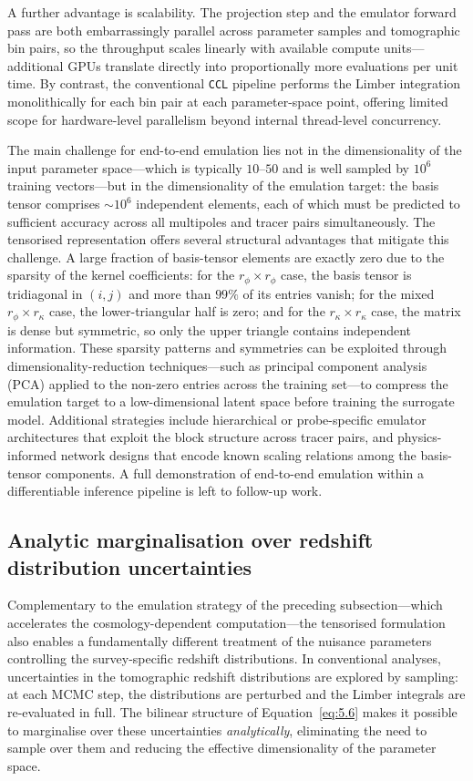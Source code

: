 A further advantage is scalability. The projection step and the emulator forward pass are both embarrassingly parallel across parameter samples and tomographic bin pairs, so the throughput scales linearly with available compute units---additional GPUs translate directly into proportionally more evaluations per unit time. By contrast, the conventional \texttt{CCL} pipeline performs the Limber integration monolithically for each bin pair at each parameter-space point, offering limited scope for hardware-level parallelism beyond internal thread-level concurrency.

The main challenge for end-to-end emulation lies not in the dimensionality of the input parameter space---which is typically \(10\)--\(50\) and is well sampled by \(10^6\) training vectors---but in the dimensionality of the emulation target: the basis tensor comprises \(\sim\!10^6\) independent elements, each of which must be predicted to sufficient accuracy across all multipoles and tracer pairs simultaneously. The tensorised representation offers several structural advantages that mitigate this challenge. A large fraction of basis-tensor elements are exactly zero due to the sparsity of the kernel coefficients: for the \(r_\phi \times r_\phi\) case, the basis tensor is tridiagonal in \((i,j)\) and more than \(99\%\) of its entries vanish; for the mixed \(r_\phi \times r_\kappa\) case, the lower-triangular half is zero; and for the \(r_\kappa \times r_\kappa\) case, the matrix is dense but symmetric, so only the upper triangle contains independent information. These sparsity patterns and symmetries can be exploited through dimensionality-reduction techniques---such as principal component analysis (PCA) applied to the non-zero entries across the training set---to compress the emulation target to a low-dimensional latent space before training the surrogate model. Additional strategies include hierarchical or probe-specific emulator architectures that exploit the block structure across tracer pairs, and physics-informed network designs that encode known scaling relations among the basis-tensor components. A full demonstration of end-to-end emulation within a differentiable inference pipeline is left to follow-up work.

\subsection{Analytic marginalisation over redshift distribution uncertainties} \label{sec:6.3}

Complementary to the emulation strategy of the preceding subsection---which accelerates the cosmology-dependent computation---the tensorised formulation also enables a fundamentally different treatment of the nuisance parameters controlling the survey-specific redshift distributions. In conventional analyses, uncertainties in the tomographic redshift distributions are explored by sampling: at each MCMC step, the distributions are perturbed and the Limber integrals are re-evaluated in full. The bilinear structure of Equation~\ref{eq:5.6} makes it possible to marginalise over these uncertainties \textit{analytically}, eliminating the need to sample over them and reducing the effective dimensionality of the parameter space.

